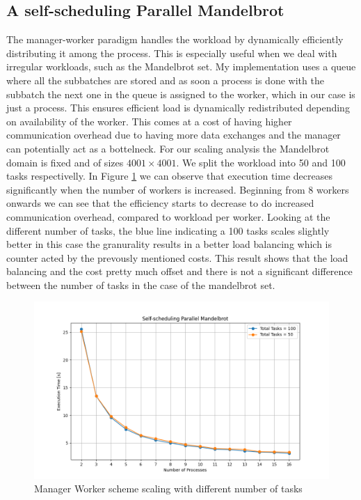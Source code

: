 \subsection{A self-scheduling Parallel Mandelbrot}
The manager-worker paradigm handles the workload by dynamically efficiently distributing it among the process. This is especially useful when we deal with irregular workloads, such as the Mandelbrot set. My implementation uses a queue where all the subbatches are stored and as soon a process is done with the subbatch the next one in the queue is assigned to the worker, which in our case is just a process. This ensures efficient load is dynamically redistributed depending on availability of the worker. This comes at a cost of having higher communication overhead due to having more data exchanges and the manager can potentially act as a bottelneck. \newline 
For our scaling analysis the Mandelbrot domain is fixed and of sizes $4001\times4001$. We split the workload into 50 and 100 tasks respectivelly. In Figure \ref{fig:manager-worker} we can observe that execution time decreases significantly when the number of workers is increased. Beginning from 8 workers onwards we can see that the efficiency starts to decrease to do increased communication overhead, compared to workload per worker.
Looking at the different number of tasks, the blue line indicating a 100 tasks scales slightly better in this case the granurality results in a better load balancing which is counter acted by the prevously mentioned costs. This result shows that the load balancing and the cost pretty much offset and there is not a significant difference between the number of tasks in the case of the mandelbrot set.
\begin{figure}[H]
	\centering
		\includegraphics[width=\textwidth]{./media/manager-worker.png}
		\caption{Manager Worker scheme scaling with different number of tasks}
		\label{fig:manager-worker}
\end{figure}
